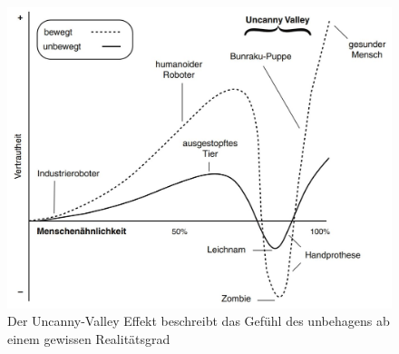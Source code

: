 \documentclass[a4paper,11pt]{article}%
\renewcommand{\\}{\vspace*{0.5\baselineskip} \newline}
\begin{document}
\begin{figure}[H]
		\begin{footnotesize}
		\begin{center}
			\includegraphics[scale=.3]{Abbildungen/Uncanny-Valley.JPG}	
			\caption[Der Uncanny-Valley Effekt]{Der Uncanny-Valley Effekt beschreibt das Gefühl des unbehagens ab einem gewissen Realitätsgrad}
			\label{Uncanny-Valley}
		\end{center}
		\end{footnotesize}
	\end{figure}	


%




	



\end{document}
